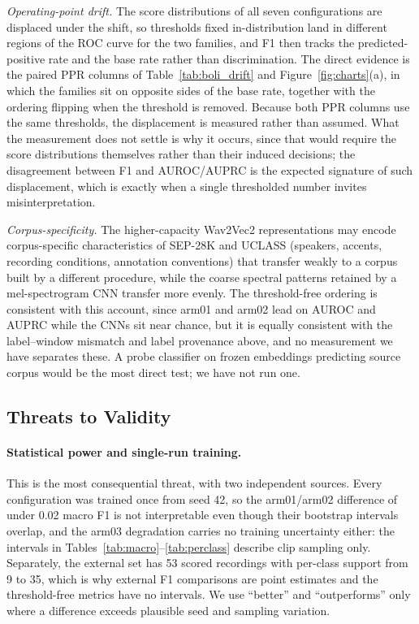 \documentclass[a4paper,orivec]{llncs}
\begin{document}
\emph{Operating-point drift.} The score distributions of all seven
configurations are displaced under the shift, so thresholds fixed
in-distribution land in different regions of the ROC curve for the two families,
and F1 then tracks the predicted-positive rate and the base rate rather than
discrimination. The direct evidence is the paired PPR columns of
Table~\ref{tab:boli_drift} and Figure~\ref{fig:charts}(a), in which the families
sit on opposite sides of the base rate, together with the ordering flipping when
the threshold is removed. Because both PPR columns use the same thresholds, the
displacement is measured rather than assumed. What the measurement does not
settle is why it occurs, since that would require the score distributions
themselves rather than their induced decisions; the disagreement between F1 and
AUROC/AUPRC is the expected signature of such displacement, which is exactly when
a single thresholded number invites misinterpretation.

\emph{Corpus-specificity.} The higher-capacity Wav2Vec2 representations may
encode corpus-specific characteristics of SEP-28K and UCLASS (speakers, accents,
recording conditions, annotation conventions) that transfer weakly to a corpus
built by a different procedure, while the coarse spectral patterns retained by a
mel-spectrogram CNN transfer more evenly. The threshold-free ordering is
consistent with this account, since arm01 and arm02 lead on AUROC and AUPRC while
the CNNs sit near chance, but it is equally consistent with the label--window
mismatch and label provenance above, and no measurement we have separates these.
A probe classifier on frozen embeddings predicting source corpus would be the
most direct test; we have not run one.

\subsection{Threats to Validity}
\label{sec:limitations}
\paragraph{Statistical power and single-run training.} This is the most
consequential threat, with two independent sources. Every configuration was
trained once from seed 42, so the arm01/arm02 difference of under 0.02 macro F1 is
not interpretable even though their bootstrap intervals overlap, and the arm03
degradation carries no training uncertainty either: the intervals in
Tables~\ref{tab:macro}--\ref{tab:perclass} describe clip sampling only. Separately,
the external set has 53 scored recordings with per-class support from 9 to 35,
which is why external F1 comparisons are point estimates and the threshold-free
metrics have no intervals. We use ``better'' and ``outperforms'' only where a
difference exceeds plausible seed and sampling variation.
\end{document}
